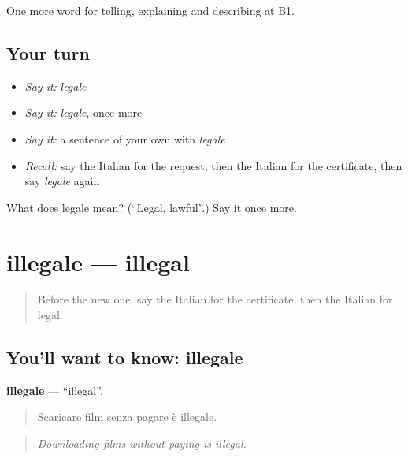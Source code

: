 \begin{grammarlens}[title={What you've built}]
One more word for telling, explaining and describing at B1.
\end{grammarlens}

\subsection*{Your turn}
\begin{itemize}
\raggedright
  \item \emph{Say it:} \emph{legale}
  \item \emph{Say it:} \emph{legale}, once more
  \item \emph{Say it:} a sentence of your own with \emph{legale}
  \item \emph{Recall:} say the Italian for the request, then the Italian for the certificate, then say \emph{legale} again
\end{itemize}

\begin{tcolorbox}[breakable,colback=teal!4,colframe=teal!35!black,title={Before you move on}]
What does legale mean? (\textquotedblleft{}Legal, lawful\textquotedblright{}.) Say it once more.
\end{tcolorbox}
\section[illegale]{illegale — illegal}

\label{lesson:IT-C390-illegale}



\begin{quote}
Before the new one: say the Italian for the certificate, then the Italian for legal.
\end{quote}

\subsection*{You'll want to know: illegale}
\textbf{illegale} — \textquotedblleft{}illegal\textquotedblright{}.

\begin{quote}
Scaricare film senza pagare è illegale.
\end{quote}

\begin{quote}
\emph{Downloading films without paying is illegal.}
\end{quote}

